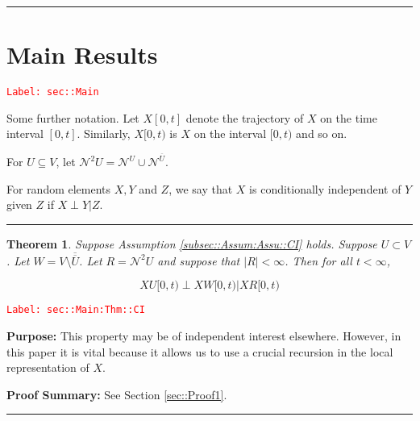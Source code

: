 \documentclass[12pt]{article}
\newcommand{\mc}{\mathcal}
\newcommand{\ov}{\overline}
\newcommand{\tr}{\textcolor{red}}
\newcommand{\labe}[1]{\tr{\texttt{Label: #1}}}
\newcommand{\purpose}{\textbf{Purpose: }}
\newcommand{\pfsum}{\textbf{Proof Summary: }}
\newcommand{\ind}{\hspace{24pt}}
\newcommand{\lin}{\rule{\linewidth}{0.4 pt}}
\renewcommand{\U}{U}							%
\newcommand{\UU}{W}								%
\newcommand{\UUU}{R}							%
\renewcommand{\t}{t}							%
\newcommand{\X}{X}								%
\newcommand{\neigh}{\mc{N}}						%
\newcommand{\dneigh}{\mc{N}^2}					%
\newcommand{\vind}[1]{^{#1}}					%
\newcommand{\XX}{Y}								%
\newcommand{\XXX}{Z}							%
\newtheorem{thms}{Theorem}[section]
\begin{document}
\lin
\section{Main Results}
\label{sec::Main}\labe{sec::Main}

Some further notation. Let \(\X{}{[0,\t]}\) denote the trajectory of \(\X{}{}\) on the time interval \([0,\t]\). Similarly, \(\X{}{[0,\t)}\) is \(\X{}{}\) on the interval \([0,\t)\) and so on.

\ind For \(\U \subseteq V\), let \(\dneigh{\U} = \neigh\vind{\U} \cup \neigh\vind{\ov{\U}}\). 

\ind For random elements \(\X{}{},\XX{}{}\) and \(\XXX{}{}\), we say that \(\X{}{}\) is conditionally independent of \(\XX{}{}\) given \(\XXX{}{}\) if \(\X{}{}\perp\XX{}{}|\XXX{}{}\).

\lin

\begin{thms}
Suppose Assumption \ref{subsec::Assum:Assu::CI} holds. Suppose \(\U \subset V\). Let \(\UU =V\setminus \ov{\ov{\U}}\). Let \(\UUU= \dneigh{U}\) and suppose that \(|\UUU| < \infty\). Then for all \(\t < \infty\),

\[\X{\U}{[0,\t)}\perp \X{\UU}{[0,\t)}|\X{\UUU}{[0,\t)}\]
\label{sec::Main:Thm::CI}
\end{thms}
\labe{sec::Main:Thm::CI}

\purpose This property may be of independent interest elsewhere. However, in this paper it is vital because it allows us to use a crucial recursion in the local representation of \(\X{}{}\).

\pfsum See Section \ref{sec::Proof1}.

\lin
\end{document}
